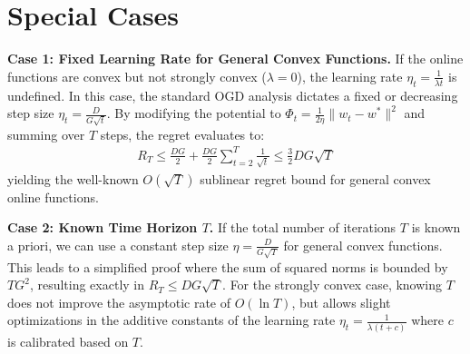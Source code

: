 \documentclass{article}
\begin{document}
\section*{Special Cases}
\textbf{Case 1: Fixed Learning Rate for General Convex Functions.}
If the online functions are convex but not strongly convex ($\lambda = 0$), the learning rate $\eta_t = \frac{1}{\lambda t}$ is undefined. In this case, the standard OGD analysis dictates a fixed or decreasing step size $\eta_t = \frac{D}{G\sqrt{t}}$. By modifying the potential to $\Phi_t = \frac{1}{2\eta} \|w_t - w^*\|^2$ and summing over $T$ steps, the regret evaluates to:
\begin{align*}
R_T \leq \frac{DG}{2} + \frac{DG}{2} \sum_{t=2}^T \frac{1}{\sqrt{t}} \leq \frac{3}{2} DG \sqrt{T}
\end{align*}
yielding the well-known $O(\sqrt{T})$ sublinear regret bound for general convex online functions.

\textbf{Case 2: Known Time Horizon $T$.}
If the total number of iterations $T$ is known a priori, we can use a constant step size $\eta = \frac{D}{G\sqrt{T}}$ for general convex functions. This leads to a simplified proof where the sum of squared norms is bounded by $T G^2$, resulting exactly in $R_T \leq DG\sqrt{T}$. For the strongly convex case, knowing $T$ does not improve the asymptotic rate of $O(\ln T)$, but allows slight optimizations in the additive constants of the learning rate $\eta_t = \frac{1}{\lambda (t + c)}$ where $c$ is calibrated based on $T$.
\end{document}
